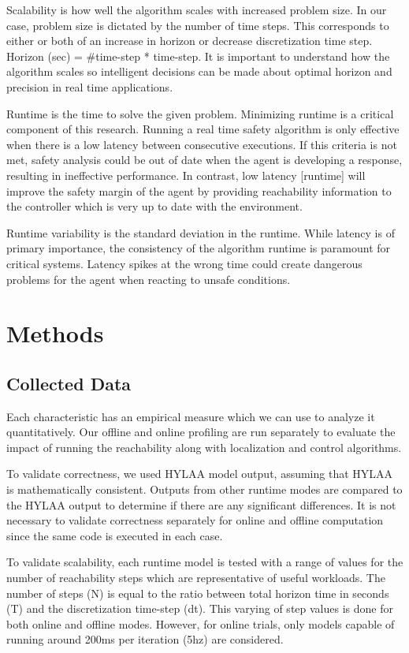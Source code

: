 \documentclass[runningheads]{llncs}
\begin{document}
Scalability is how well the algorithm scales with increased problem size. In our case, problem size is dictated by the number of time steps. This corresponds to either or both of an increase in horizon or decrease discretization time step. Horizon (sec) = \#time-step * time-step. It is important to understand how the algorithm scales so intelligent decisions can be made about optimal horizon and precision in real time applications.

Runtime is the time to solve the given problem. Minimizing runtime is a critical component of this research. Running a real time safety algorithm is only effective when there is a low latency between consecutive executions. If this criteria is not met, safety analysis could be out of date when the agent is developing a response, resulting in ineffective performance. In contrast, low latency [runtime] will improve the safety margin of the agent by providing reachability information to the controller which is very up to date with the environment.

Runtime variability is the standard deviation in the runtime. While latency is of primary importance, the consistency of the algorithm runtime is paramount for critical systems. Latency spikes at the wrong time could create dangerous problems for the agent when reacting to unsafe conditions. 

\section{Methods}
\subsection{Collected Data}
Each characteristic has an empirical measure which we can use to analyze it quantitatively. Our offline and online profiling are run separately to evaluate the impact of running the reachability along with localization and control algorithms.

To validate correctness, we used HYLAA model output, assuming that HYLAA is mathematically consistent. Outputs from other runtime modes are compared to the HYLAA output to determine if there are any significant differences. It is not necessary to validate correctness separately for online and offline computation since the same code is executed in each case.

To validate scalability, each runtime model is tested with a range of values for the number of reachability steps which are representative of useful workloads. The number of steps (N) is equal to the ratio between total horizon time in seconds (T) and the discretization time-step (dt). This varying of step values is done for both online and offline modes. However, for online trials, only models capable of running around 200ms per iteration (5hz) are considered.
\end{document}
